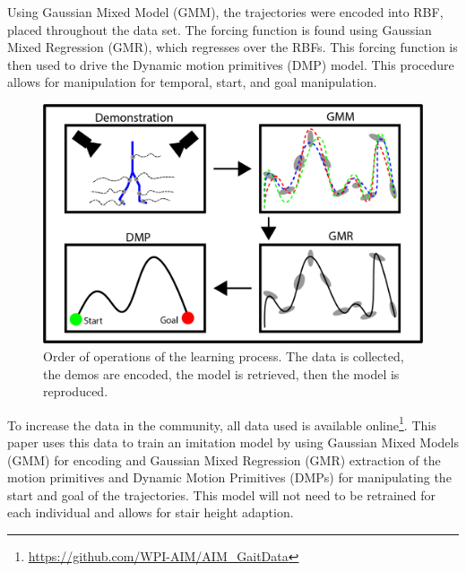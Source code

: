 Using Gaussian Mixed Model (GMM), the trajectories were encoded into RBF, placed throughout the data set. The forcing function is found using Gaussian Mixed Regression (GMR), which regresses over the RBFs. This forcing function is then used to drive the Dynamic motion primitives (DMP) model. This procedure allows for manipulation for temporal, start, and goal manipulation.  

\begin{figure} 
    \centering 
    \includegraphics[scale=0.2]{images/demo_figure.png} 
    \caption{Order of operations of the learning process. The data is collected, the demos are encoded, the model is retrieved, then the model is reproduced.} 
    \label{fig:demostation} 
\end{figure} 


To increase the data in the community, all data used is available online\footnote{\url{https://github.com/WPI-AIM/AIM\_GaitData}}. This paper uses this data to train an imitation model by using Gaussian Mixed Models (GMM) for encoding and Gaussian Mixed Regression (GMR) extraction of the motion primitives and Dynamic Motion Primitives (DMPs) for manipulating the start and goal of the trajectories. This model will not need to be retrained for each individual and allows for stair height adaption.